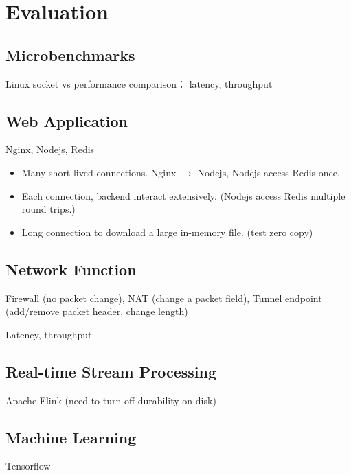\section{Evaluation}
\label{sec:evaluation}

\subsection{Microbenchmarks}

Linux socket vs \sys performance comparison： latency, throughput

\subsection{Web Application}

Nginx, Nodejs, Redis

\begin{itemize}
	\item Many short-lived connections. Nginx $\rightarrow$ Nodejs, Nodejs access Redis once.
	\item Each connection, backend interact extensively. (Nodejs access Redis multiple round trips.)
	\item Long connection to download a large in-memory file. (test zero copy)
\end{itemize}

\subsection{Network Function}

Firewall (no packet change), NAT (change a packet field), Tunnel endpoint (add/remove packet header, change length)

Latency, throughput

\subsection{Real-time Stream Processing}

Apache Flink (need to turn off durability on disk)

\subsection{Machine Learning}

Tensorflow